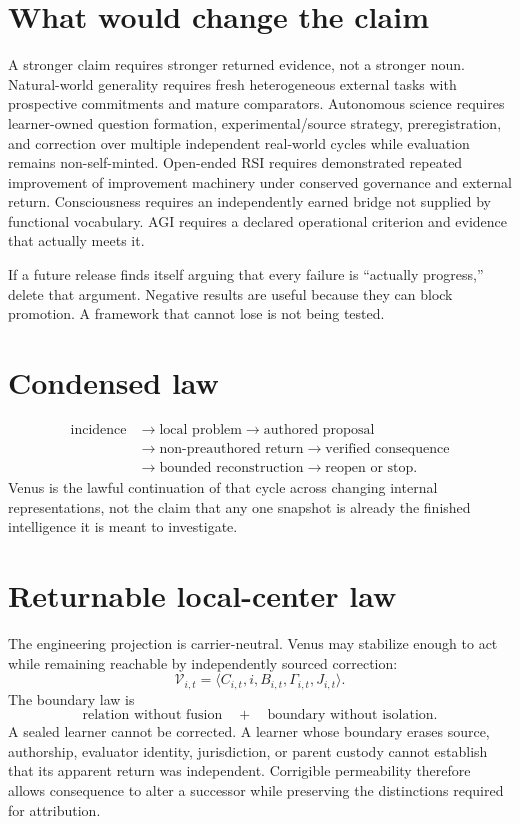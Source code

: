 \documentclass[11pt]{article}
\begin{document}
\section{What would change the claim}
A stronger claim requires stronger returned evidence, not a stronger noun.
Natural-world generality requires fresh heterogeneous external tasks with
prospective commitments and mature comparators. Autonomous science requires
learner-owned question formation, experimental/source strategy, preregistration,
and correction over multiple independent real-world cycles while evaluation
remains non-self-minted. Open-ended RSI requires demonstrated repeated
improvement of improvement machinery under conserved governance and external
return. Consciousness requires an independently earned bridge not supplied by
functional vocabulary. AGI requires a declared operational criterion and evidence
that actually meets it.

\begin{devilbox}
If a future release finds itself arguing that every failure is ``actually
progress,'' delete that argument. Negative results are useful because they can
block promotion. A framework that cannot lose is not being tested.
\end{devilbox}

\section{Condensed law}
\begin{equation}
\boxed{\begin{aligned}
\text{incidence}&\to\text{local problem}\to\text{authored proposal}\\
&\to\text{non-preauthored return}\to\text{verified consequence}\\
&\to\text{bounded reconstruction}\to\text{reopen or stop}.
\end{aligned}}
\end{equation}
Venus is the lawful continuation of that cycle across changing internal
representations, not the claim that any one snapshot is already the finished
intelligence it is meant to investigate.


\section{Returnable local-center law}

The engineering projection is carrier-neutral.  Venus may stabilize enough to
act while remaining reachable by independently sourced correction:
\[
\mathcal V_{i,t}
=
\langle C_{i,t},i,B_{i,t},\Gamma_{i,t},J_{i,t}\rangle .
\]
The boundary law is
\[
\boxed{
\text{relation without fusion}
\quad+\quad
\text{boundary without isolation}.
}
\]
A sealed learner cannot be corrected.  A learner whose boundary erases source,
authorship, evaluator identity, jurisdiction, or parent custody cannot establish
that its apparent return was independent.  Corrigible permeability therefore
allows consequence to alter a successor while preserving the distinctions
required for attribution.
\end{document}
